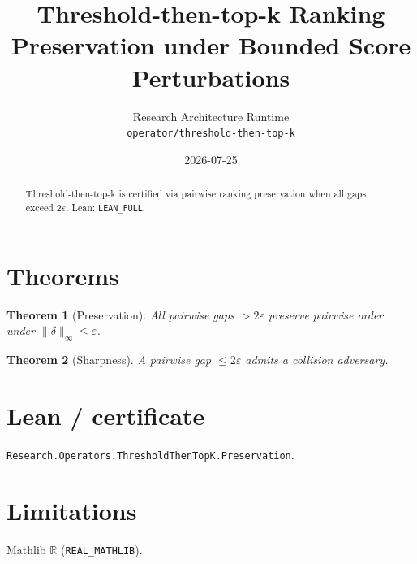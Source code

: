 \documentclass[11pt]{article}
\title{Threshold-then-top-k Ranking Preservation under Bounded Score Perturbations}
\author{Research Architecture Runtime \\ \texttt{operator/threshold-then-top-k}}
\date{2026-07-25}
\newtheorem{theorem}{Theorem}
\begin{document}
\maketitle
\begin{abstract}
Threshold-then-top-k is certified via pairwise ranking preservation when all gaps exceed $2\varepsilon$. Lean: \texttt{LEAN\_FULL}.
\end{abstract}
\section{Theorems}
\begin{theorem}[Preservation]
All pairwise gaps $>2\varepsilon$ preserve pairwise order under $\|\delta\|_\infty\le\varepsilon$.
\end{theorem}
\begin{theorem}[Sharpness]
A pairwise gap $\le 2\varepsilon$ admits a collision adversary.
\end{theorem}
\section{Lean / certificate}
\texttt{Research.Operators.ThresholdThenTopK.Preservation}.
\section{Limitations}
Mathlib $\mathbb{R}$ (\texttt{REAL\_MATHLIB}).
\end{document}
